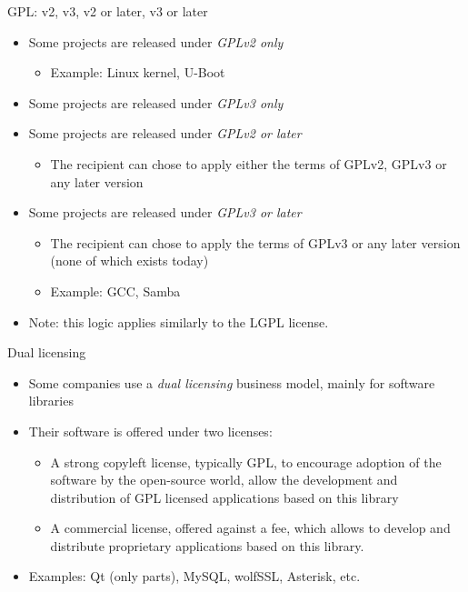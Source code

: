 \begin{frame}{GPL: v2, v3, v2 or later, v3 or later}
  \begin{itemize}
  \item Some projects are released under {\em GPLv2 only}
    \begin{itemize}
    \item Example: Linux kernel, U-Boot
    \end{itemize}
  \item Some projects are released under {\em GPLv3 only}
  \item Some projects are released under {\em GPLv2 or later}
    \begin{itemize}
    \item The recipient can chose to apply either the terms of GPLv2,
      GPLv3 or any later version
    \end{itemize}
  \item Some projects are released under {\em GPLv3 or later}
    \begin{itemize}
    \item The recipient can chose to apply the terms of GPLv3 or any
      later version (none of which exists today)
    \item Example: GCC, Samba
    \end{itemize}
  \item Note: this logic applies similarly to the LGPL license.
  \end{itemize}
\end{frame}

\begin{frame}{Dual licensing}
  \begin{itemize}
  \item Some companies use a {\em dual licensing} business model,
    mainly for software libraries
  \item Their software is offered under two licenses:
    \begin{itemize}
    \item A strong copyleft license, typically GPL, to encourage
      adoption of the software by the open-source world, allow the
      development and distribution of GPL licensed applications based
      on this library
    \item A commercial license, offered against a fee, which allows to
      develop and distribute proprietary applications based on this
      library.
    \end{itemize}
  \item Examples: Qt (only parts), MySQL, wolfSSL, Asterisk, etc.
  \end{itemize}
\end{frame}

